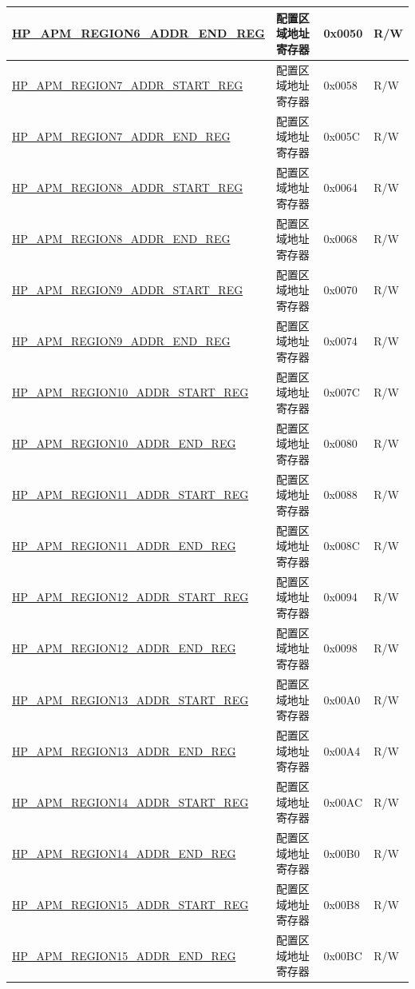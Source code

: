 \begin{longtable}{ | L{6.5cm} | l | l | l | }
\hyperref[regdesc:HPAPMREGIONNADDRENDREG]{HP\_APM\_REGION6\_ADDR\_END\_REG} & 配置区域地址寄存器 & 0x0050 & R/W \\ \hline
\hyperref[regdesc:HPAPMREGIONNADDRSTARTREG]{HP\_APM\_REGION7\_ADDR\_START\_REG} & 配置区域地址寄存器 & 0x0058 & R/W \\ \hline
\hyperref[regdesc:HPAPMREGIONNADDRENDREG]{HP\_APM\_REGION7\_ADDR\_END\_REG} & 配置区域地址寄存器 & 0x005C & R/W \\ \hline
\hyperref[regdesc:HPAPMREGIONNADDRSTARTREG]{HP\_APM\_REGION8\_ADDR\_START\_REG} & 配置区域地址寄存器 & 0x0064 & R/W \\ \hline
\hyperref[regdesc:HPAPMREGIONNADDRENDREG]{HP\_APM\_REGION8\_ADDR\_END\_REG} & 配置区域地址寄存器 & 0x0068 & R/W \\ \hline
\hyperref[regdesc:HPAPMREGIONNADDRSTARTREG]{HP\_APM\_REGION9\_ADDR\_START\_REG} & 配置区域地址寄存器 & 0x0070 & R/W \\ \hline
\hyperref[regdesc:HPAPMREGIONNADDRENDREG]{HP\_APM\_REGION9\_ADDR\_END\_REG} & 配置区域地址寄存器 & 0x0074 & R/W \\ \hline
\hyperref[regdesc:HPAPMREGIONNADDRSTARTREG]{HP\_APM\_REGION10\_ADDR\_START\_REG} & 配置区域地址寄存器 & 0x007C & R/W \\ \hline
\hyperref[regdesc:HPAPMREGIONNADDRENDREG]{HP\_APM\_REGION10\_ADDR\_END\_REG} & 配置区域地址寄存器 & 0x0080 & R/W \\ \hline
\hyperref[regdesc:HPAPMREGIONNADDRSTARTREG]{HP\_APM\_REGION11\_ADDR\_START\_REG} & 配置区域地址寄存器 & 0x0088 & R/W \\ \hline
\hyperref[regdesc:HPAPMREGIONNADDRENDREG]{HP\_APM\_REGION11\_ADDR\_END\_REG} & 配置区域地址寄存器 & 0x008C & R/W \\ \hline
\hyperref[regdesc:HPAPMREGIONNADDRSTARTREG]{HP\_APM\_REGION12\_ADDR\_START\_REG} & 配置区域地址寄存器 & 0x0094 & R/W \\ \hline
\hyperref[regdesc:HPAPMREGIONNADDRENDREG]{HP\_APM\_REGION12\_ADDR\_END\_REG} & 配置区域地址寄存器 & 0x0098 & R/W \\ \hline
\hyperref[regdesc:HPAPMREGIONNADDRSTARTREG]{HP\_APM\_REGION13\_ADDR\_START\_REG} & 配置区域地址寄存器 & 0x00A0 & R/W \\ \hline
\hyperref[regdesc:HPAPMREGIONNADDRENDREG]{HP\_APM\_REGION13\_ADDR\_END\_REG} & 配置区域地址寄存器 & 0x00A4 & R/W \\ \hline
\hyperref[regdesc:HPAPMREGIONNADDRSTARTREG]{HP\_APM\_REGION14\_ADDR\_START\_REG} & 配置区域地址寄存器 & 0x00AC & R/W \\ \hline
\hyperref[regdesc:HPAPMREGIONNADDRENDREG]{HP\_APM\_REGION14\_ADDR\_END\_REG} & 配置区域地址寄存器 & 0x00B0 & R/W \\ \hline
\hyperref[regdesc:HPAPMREGIONNADDRSTARTREG]{HP\_APM\_REGION15\_ADDR\_START\_REG} & 配置区域地址寄存器 & 0x00B8 & R/W \\ \hline
\hyperref[regdesc:HPAPMREGIONNADDRENDREG]{HP\_APM\_REGION15\_ADDR\_END\_REG} & 配置区域地址寄存器 & 0x00BC & R/W \\ \hline


\end{longtable}
